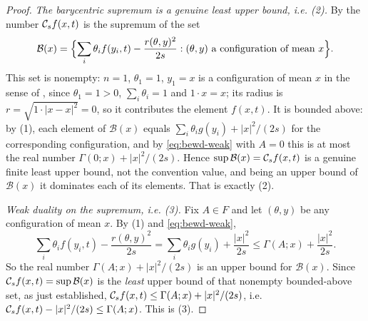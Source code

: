 \begin{proof}
\emph{The barycentric supremum is a genuine least upper bound, i.e. (2).}
By  the number $\mathcal{C}_sf(x,t)$ is the supremum of the set
\[
  \mathcal B(x)=\Bigl\{\sum_i\theta_if(y_i,t)-\frac{r(\theta,y)^2}{2s}
     :(\theta,y)\text{ a configuration of mean }x\Bigr\}.
\]
This set is nonempty: $n=1$, $\theta_1=1$, $y_1=x$ is a configuration of mean $x$
in the sense of , since $\theta_1=1>0$, $\sum_i\theta_i=1$
and $1\cdot x=x$; its radius is $r=\sqrt{1\cdot|x-x|^2}=0$, so it contributes the
element $f(x,t)$.
It is bounded above: by (1), each element of $\mathcal B(x)$ equals
$\sum_i\theta_ig(y_i)+|x|^2/(2s)$ for the corresponding configuration, and by
\eqref{eq:bewd-weak} with $A=0$ this is at most the real number
$\Gamma(0;x)+|x|^2/(2s)$.
Hence $\sup\mathcal B(x)=\mathcal{C}_sf(x,t)$ is a genuine finite least upper bound,
not the convention value, and being an upper bound of $\mathcal B(x)$ it
dominates each of its elements. That is exactly (2).

\emph{Weak duality on the supremum, i.e. (3).}
Fix $A\in F$ and let $(\theta,y)$ be any configuration of mean $x$. By (1) and
\eqref{eq:bewd-weak},
\[
  \sum_i\theta_if(y_i,t)-\frac{r(\theta,y)^2}{2s}
   =\sum_i\theta_ig(y_i)+\frac{|x|^2}{2s}
   \le\Gamma(A;x)+\frac{|x|^2}{2s}.
\]
So the real number $\Gamma(A;x)+|x|^2/(2s)$ is an upper bound for
$\mathcal B(x)$. Since $\mathcal{C}_sf(x,t)=\sup\mathcal B(x)$ is the \emph{least}
upper bound of that nonempty bounded-above set, as just established,
$\mathcal{C}_sf(x,t)\le\Gamma(A;x)+|x|^2/(2s)$, i.e.
$\mathcal{C}_sf(x,t)-|x|^2/(2s)\le\Gamma(A;x)$. This is (3).
\end{proof}

